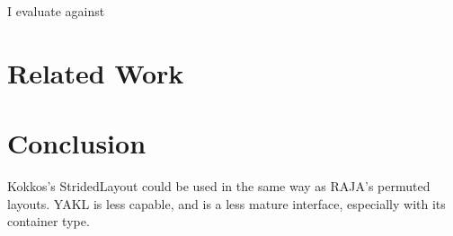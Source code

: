 I evaluate \FormatDecisions{} against 
\section{Related Work}

\section{Conclusion}

Kokkos's StridedLayout could be used in the same way as RAJA's permuted layouts. 
YAKL is less capable, and is a less mature interface, especially with its container type.






